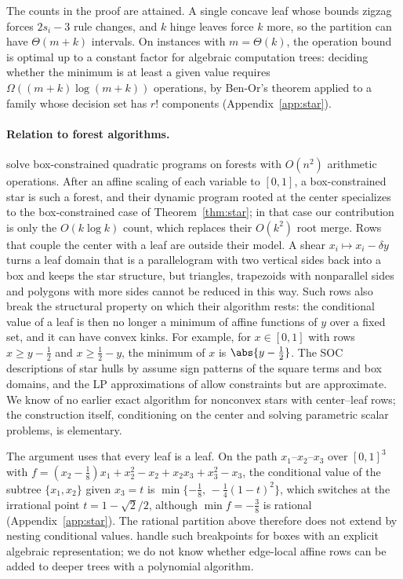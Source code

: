 The counts in the proof are attained. A single concave leaf whose bounds
zigzag forces $2s_i-3$ rule changes, and $k$ hinge leaves force $k$
more, so the partition can have $\Theta(m+k)$ intervals. On instances
with $m=\Theta(k)$, the operation bound is optimal up to a constant factor
for algebraic computation trees: deciding whether the minimum is at least
a given value requires $\Omega((m+k)\log(m+k))$ operations, by Ben-Or's
theorem applied to a family whose decision set has $r!$ components
(Appendix~\ref{app:star}).

\paragraph{Relation to forest algorithms.}
\citet{DelPiaKhajavirad2026} solve box-constrained quadratic programs on
forests with $O(n^2)$ arithmetic operations. After an affine scaling of
each variable to $[0,1]$, a box-constrained star is such a forest, and
their dynamic program rooted at the center specializes to the
box-constrained case of Theorem~\ref{thm:star}; in that case our
contribution is only the $O(k\log k)$ count, which replaces their
$O(k^2)$ root merge. Rows that couple the center with a leaf are outside
their model. A shear $x_i\mapsto x_i-\delta y$ turns a leaf domain that is a
parallelogram with two vertical sides back into a box and keeps the star
structure, but triangles, trapezoids with nonparallel sides and polygons
with more sides cannot be reduced in this way. Such rows also break the
structural property on which their algorithm rests: the conditional value
of a leaf is then no longer a minimum of affine functions of $y$ over a
fixed set, and it can have convex kinks. For example, for $x\in[0,1]$
with rows $x\ge y-\tfrac12$ and $x\ge\tfrac12-y$, the minimum of $x$ is
$\abs{y-\tfrac12}$. The SOC descriptions of star hulls by
\citet{DeyKhajavirad2025} assume sign patterns of the square terms and
box domains, and the LP approximations of \citet{BienstockMunoz2018}
allow constraints but are approximate. We know of no earlier exact
algorithm for nonconvex stars with center--leaf rows; the construction
itself, conditioning on the center and solving parametric scalar
problems, is elementary.

\begin{remark}\label{rem:trees}
The argument uses that every leaf is a leaf. On the path
$x_1$--$x_2$--$x_3$ over $[0,1]^3$ with
$f=(x_2-\tfrac18)x_1+x_2^2-x_2+x_2x_3+x_3^2-x_3$, the conditional value of the
subtree $\{x_1,x_2\}$ given $x_3=t$ is
$\min\{-\tfrac18,\,-\tfrac14(1-t)^2\}$, which switches at the irrational
point $t=1-\sqrt2/2$, although $\min f=-\tfrac38$ is rational
(Appendix~\ref{app:star}). The rational partition above therefore does
not extend by nesting conditional values. \citeauthor{DelPiaKhajavirad2026}
handle such breakpoints for boxes with an explicit algebraic
representation; we do not know whether edge-local affine rows can be
added to deeper trees with a polynomial algorithm.
\end{remark}

